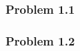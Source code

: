 \documentclass[12pt,letterpaper]{article}
\newcommand\chpnum{1}                  %
\newenvironment{answer}[1]{
  \subsubsection*{Problem \chpnum.#1}
}{\newpage}
\begin{document}
\begin{answer}{1}

\end{answer}

\begin{answer}{2}

\end{answer}
\end{document}
